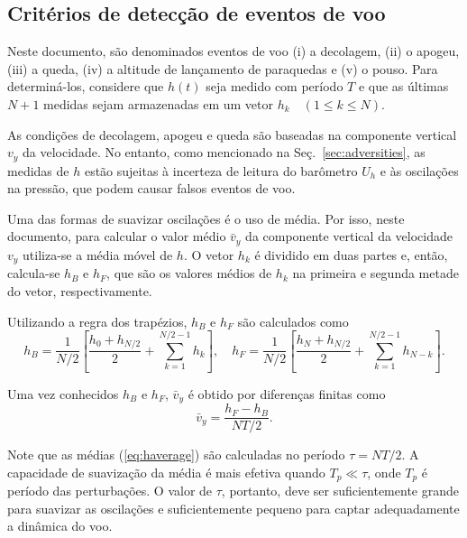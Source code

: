 \documentclass[12pt,a4paper]{article}
\begin{document}
\subsection{Critérios de detecção de eventos de voo}
\label{sec:flightevents}

Neste documento, são denominados eventos de voo (i) a decolagem, (ii) o apogeu, (iii) a queda, (iv) a altitude de lançamento de paraquedas e (v) o pouso. Para determiná-los, considere que $h(t)$ seja medido com período $T$ e que as últimas $N+1$ medidas sejam armazenadas em um vetor $h_k\quad (1\le k \le N)$.

As condições de decolagem, apogeu e queda são baseadas na componente vertical $v_y$ da velocidade. No entanto, como mencionado na Seç.~\ref{sec:adversities}, as medidas de $h$ estão sujeitas à incerteza de leitura do barômetro $U_h$ e às oscilações na pressão, que podem causar falsos eventos de voo. 

Uma das formas de suavizar oscilações é o uso de média. Por isso, neste documento, para calcular o valor médio $\bar{v}_y$ da componente vertical da velocidade $v_y$ utiliza-se a média móvel de $h$. O vetor $h_k$ é dividido em duas partes e, então, calcula-se $h_B$ e $h_F$, que são os valores médios de $h_k$ na primeira e segunda metade do vetor, respectivamente.   

Utilizando a regra dos trapézios, $h_B$ e $h_F$ são calculados como
\begin{equation}
	h_B=\frac{1}{N/2}\left[\frac{h_0+h_{N/2}}{2}+\sum_{k=1}^{N/2-1}h_k\right], \quad h_F=\frac{1}{N/2}\left[\frac{h_N+h_{N/2}}{2}+\sum_{k=1}^{N/2-1}h_{N-k}\right].
\label{eq:haverage}
\end{equation}

Uma vez conhecidos $h_B$ e $h_F$, $\bar{v}_y$ é obtido por diferenças finitas como
\begin{equation}
\bar{v}_y=\frac{h_F-h_B}{NT/2}.
\end{equation}

Note que as médias (\ref{eq:haverage}) são calculadas no período $\tau=NT/2$. A capacidade de suavização da média é mais efetiva quando $T_p \ll \tau$, onde $T_p$ é período das perturbações. O valor de $\tau$, portanto, deve ser suficientemente grande para suavizar as oscilações e suficientemente pequeno para captar adequadamente a dinâmica do voo. 
\end{document}
